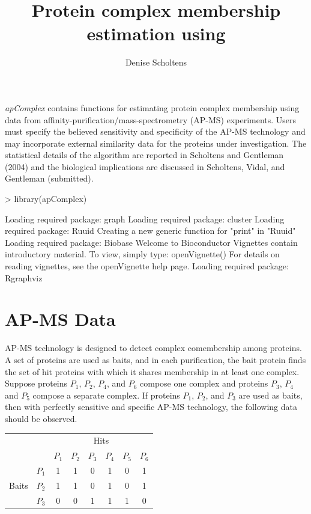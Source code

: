 \documentclass[11pt]{article}
\title{Protein complex membership estimation using \Rpackage{apComplex}}
\author{Denise Scholtens}
\date{}
\newcommand{\Rpackage}[1]{{\textit{#1}}}
\begin{document}
\maketitle
\Rpackage{apComplex} contains functions for estimating protein complex membership using data from
affinity-purification/mass-spectrometry (AP-MS) experiments.  Users must
specify the believed sensitivity and specificity of the AP-MS technology and
may incorporate external similarity data for the proteins under
investigation.  The statistical details of the algorithm are reported in
Scholtens and Gentleman (2004) and the biological implications are discussed
in Scholtens, Vidal, and Gentleman (submitted).  

\begin{Schunk}
\begin{Sinput}
> library(apComplex)
\end{Sinput}
\begin{Soutput}
Loading required package: graph 
Loading required package: cluster 
Loading required package: Ruuid 
Creating a new generic function for "print" in "Ruuid" 
Loading required package: Biobase 
Welcome to Bioconductor 
	 Vignettes contain introductory material.  To view, 
	 simply type: openVignette() 
	 For details on reading vignettes, see
	 the openVignette help page.
Loading required package: Rgraphviz 
\end{Soutput}
\end{Schunk}

\section*{AP-MS Data}

AP-MS technology is designed to detect complex comembership among proteins.  A
set of proteins are used as baits, and in each purification, the bait protein finds the set of hit proteins with which it
shares membership in at least one complex.  Suppose proteins $P_{1}$, $P_{2}$, $P_{4}$,
and $P_{6}$ compose one complex and proteins $P_{3}$, $P_{4}$ and
$P_{5}$ compose a separate complex.  If proteins $P_{1}$, $P_{2}$, and $P_{3}$
are used as baits, then with perfectly sensitive and specific AP-MS
technology, the following data should be observed.

\vspace{.2in}

\begin{tabular}{cc|cccccc}
 & \multicolumn{1}{c}{} & \multicolumn{6}{c}{Hits} \\
 & \multicolumn{1}{c}{} & $P_{1}$ & $P_{2}$ & $P_{3}$ & $P_{4}$ & $P_{5}$ & $P_{6}$  \\
\cline{3-8}
 & $P_{1}$ & 1 & 1 & 0 & 1 & 0 & 1 \\
Baits & $P_{2}$ & 1 & 1 & 0 & 1 & 0 & 1 \\
 & $P_{3}$ & 0 & 0 & 1 & 1 & 1 & 0 \\
\end{tabular}
\end{document}
